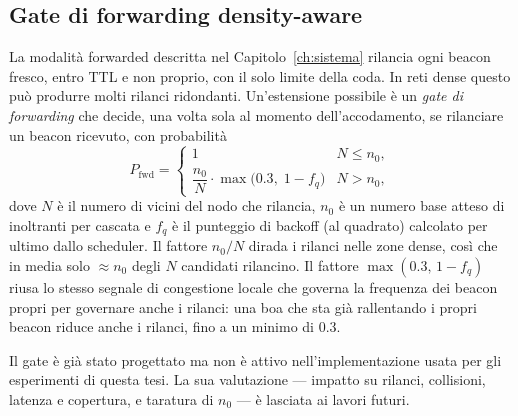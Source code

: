 %
%

\subsection{Gate di forwarding density-aware}
\label{sec:future-fwdgate}

La modalit\`a forwarded descritta nel Capitolo~\ref{ch:sistema} rilancia ogni
beacon fresco, entro TTL e non proprio, con il solo limite della coda. In reti
dense questo pu\`o produrre molti rilanci ridondanti. Un'estensione possibile \`e
un \emph{gate di forwarding} che decide, una volta sola al momento
dell'accodamento, se rilanciare un beacon ricevuto, con probabilit\`a
\begin{equation}
  P_{\text{fwd}} =
  \begin{cases}
    1 & N \le n_0,\\[2pt]
    \dfrac{n_0}{N}\cdot \max\!\big(0.3,\;1-f_q\big) & N > n_0,
  \end{cases}
  \label{eq:fwdgate}
\end{equation}
dove $N$ \`e il numero di vicini del nodo che rilancia, $n_0$ \`e un numero base
atteso di inoltranti per cascata e $f_q$ \`e il punteggio di backoff (al quadrato)
calcolato per ultimo dallo scheduler. Il fattore $n_0/N$ dirada i rilanci nelle
zone dense, cos\`i che in media solo $\approx n_0$ degli $N$ candidati rilancino.
Il fattore $\max(0.3,\,1-f_q)$ riusa lo stesso segnale di congestione locale che
governa la frequenza dei beacon propri per governare anche i rilanci: una boa che
sta gi\`a rallentando i propri beacon riduce anche i rilanci, fino a un minimo di
$0.3$.

Il gate \`e gi\`a stato progettato ma non \`e attivo nell'implementazione usata
per gli esperimenti di questa tesi. La sua valutazione --- impatto su rilanci,
collisioni, latenza e copertura, e taratura di $n_0$ --- \`e lasciata ai lavori
futuri.
